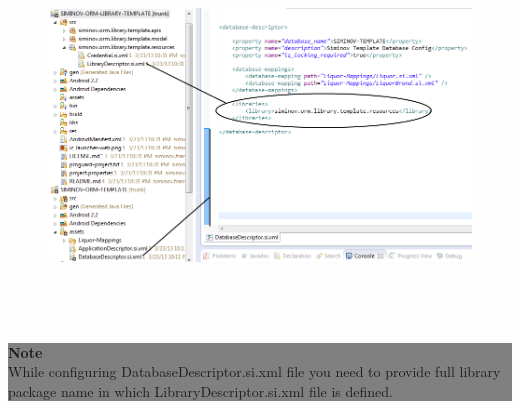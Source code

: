\begin{enumerate}
		\begin{figure}[!htbp]
			\centering
				\includegraphics[height=10cm]{Resources/siminov_library_template_configure.png}
		\end{figure}

		\begin{center}
			\colorbox{grey}{
			\parbox[t]{.8\linewidth}{
				\fontsize{11pt}{11pt}\selectfont %
				\vspace*{0.1cm} %
		
				\hfill \textbf{Note} \\
					While configuring DatabaseDescriptor.si.xml file you need to provide full library package name in which LibraryDescriptor.si.xml file is defined.

				\vspace*{0.0cm} %
				}
			}

		\end{center}



\end{enumerate}
